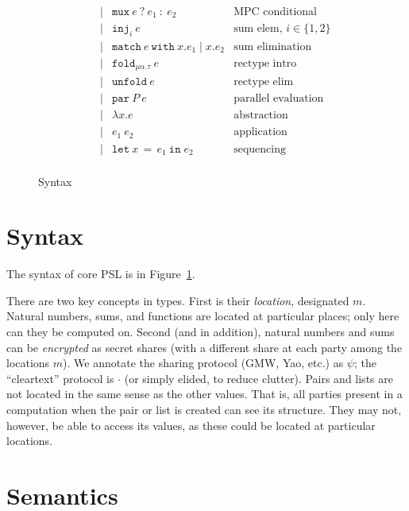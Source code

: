 \documentclass[10pt]{article}
\newcommand{\kw}[1]{\ensuremath{\mathtt{#1}}}
\newcommand{\trec}[2]{\ensuremath{\mu {#1}.{#2}}}
\newcommand{\elet}[3]{\ensuremath{\kw{let}~#1\, =\, #2~\kw{in}\;{#3}}}
\newcommand{\epar}[2]{\ensuremath{\kw{par}~{#1}~{#2}}}
\newcommand{\econd}[3]{\ensuremath{\kw{match}~{#1}~\kw{with}~x.{#2} \mid x.{#3}}}
\newcommand{\emux}[3]{\ensuremath{\kw{mux}~{#1}~\kw{?}~{#2}~\kw{:}~{#3}}}
\newcommand{\einj}[2]{\ensuremath{\kw{inj}_{#1}~{#2}}}
\newcommand{\elam}[2]{\ensuremath{\lambda {#1}.{#2}}}
\newcommand{\eapp}[2]{\ensuremath{{#1}~{#2}}}
\newcommand{\efold}[2]{\ensuremath{\kw{fold}_{#1}~{#2}}}
\newcommand{\eunfold}[1]{\ensuremath{\kw{unfold}~{#1}}}
\begin{document}
\begin{figure}[h]
\[\begin{array}{rlcll}
                       && \mid & \emux{e}{e_1}{e_2}  & \text{MPC conditional} \\
                       && \mid & \einj{i}{e} & \text{sum elem, }i \in \{1,2\}\\
                       && \mid & \econd{e}{e_1}{e_2}  & \text{sum elimination} \\
                       && \mid & \efold{\trec{\alpha}{\tau}}{e} & \text{rectype intro}\\
                       && \mid & \eunfold{e} & \text{rectype elim}\\
                       && \mid & \epar{P}{e} & \text{parallel evaluation}\\
                       && \mid & \elam{x}{e}  & \text{abstraction} \\
                       && \mid & \eapp{e_1}{e_2}  & \text{application} \\
                       && \mid & \elet{x}{e_1}{e_2}  & \text{sequencing} \\
  \end{array}
  \]
  \caption{Syntax}
  \label{fig:syntax}
\end{figure}

\newpage

\section{Syntax}
  
The syntax of core PSL is in Figure~\ref{fig:syntax}.

There are two key concepts in types. First is their \emph{location},
designated $m$. Natural numbers, sums, and functions are located at
particular places; only here can they be computed on. Second (and in
addition), natural numbers and sums can be \emph{encrypted} as secret
shares (with a different share at each party among the locations
$m$). We annotate the sharing protocol (GMW, Yao, etc.) as $\psi$; the
``cleartext'' protocol is $\cdot$ (or simply elided, to reduce
clutter). Pairs and lists are not located in the same sense as the
other values. That is, all parties present in a computation when the
pair or list is created can see its structure. They may not, however,
be able to access its values, as these could be located at particular
locations.

\section{Semantics}
\end{document}
